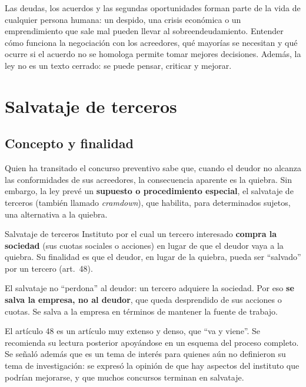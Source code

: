 \documentclass[12pt,oneside]{book}
\begin{document}
\begin{note}
Las deudas, los acuerdos y las segundas oportunidades forman parte de la vida de cualquier persona humana: un despido, una crisis económica o un emprendimiento que sale mal pueden llevar al sobreendeudamiento. Entender cómo funciona la negociación con los acreedores, qué mayorías se necesitan y qué ocurre si el acuerdo no se homologa permite tomar mejores decisiones. Además, la ley no es un texto cerrado: se puede pensar, criticar y mejorar.
\end{note}

\chapter[Salvataje de terceros]{Salvataje de terceros}

\section{Concepto y finalidad}

Quien ha transitado el concurso preventivo sabe que, cuando el deudor no alcanza las conformidades de sus acreedores, la consecuencia aparente es la quiebra. Sin embargo, la ley prevé un \textbf{supuesto o procedimiento especial}, el salvataje de terceros (también llamado \textit{cramdown}), que habilita, para determinados sujetos, una alternativa a la quiebra.

\begin{definition}{Salvataje de terceros}
Instituto por el cual un tercero interesado \textbf{compra la sociedad} (sus cuotas sociales o acciones) en lugar de que el deudor vaya a la quiebra. Su finalidad es que el deudor, en lugar de la quiebra, pueda ser ``salvado'' por un tercero (art.~48).
\end{definition}

\begin{important}
El salvataje no ``perdona'' al deudor: un tercero adquiere la sociedad. Por eso \textbf{se salva la empresa, no al deudor}, que queda desprendido de sus acciones o cuotas. Se salva a la empresa en términos de mantener la fuente de trabajo.
\end{important}

\begin{note}
El artículo 48 es un artículo muy extenso y denso, que ``va y viene''. Se recomienda su lectura posterior apoyándose en un esquema del proceso completo. Se señaló además que es un tema de interés para quienes aún no definieron su tema de investigación: se expresó la opinión de que hay aspectos del instituto que podrían mejorarse, y que muchos concursos terminan en salvataje.
\end{note}
\end{document}
